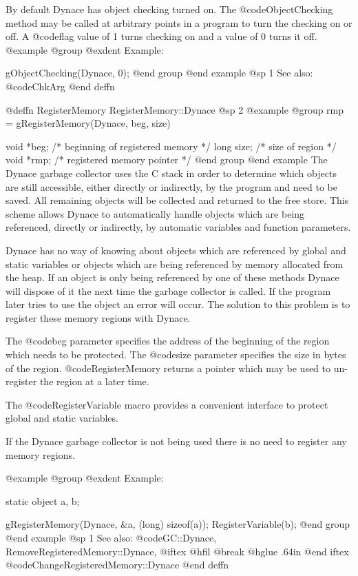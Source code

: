 By default Dynace has object checking turned on.  The @code{ObjectChecking}
method may be called at arbitrary points in a program to turn the checking
on or off.  A @code{flag} value of 1 turns checking on and a value of 0
turns it off.
@example
@group
@exdent Example:

gObjectChecking(Dynace, 0);
@end group
@end example
@sp 1
See also:  @code{ChkArg}
@end deffn





@deffn {RegisterMemory} RegisterMemory::Dynace
@sp 2
@example
@group
rmp = gRegisterMemory(Dynace, beg, size)

void    *beg;   /*  beginning of registered memory  */
long    size;   /*  size of region      */
void    *rmp;   /*  registered memory pointer  */
@end group
@end example
The Dynace garbage collector uses the C stack in order to determine which
objects are still accessible, either directly or indirectly, by the
program and need to be saved.  All remaining objects will be collected
and returned to the free store.  This scheme allows Dynace to automatically
handle objects which are being referenced, directly or indirectly, by
automatic variables and function parameters.

Dynace has no way of knowing about objects which are referenced by global
and static variables or objects which are being referenced by memory
allocated from the heap.  If an object is only being referenced by
one of these methods Dynace will dispose of it the next time the
garbage collector is called.  If the program later tries to use the
object an error will occur.  The solution to this problem is to
register these memory regions with Dynace.

The @code{beg} parameter specifies the address of the beginning of the
region which needs to be protected.  The @code{size} parameter specifies
the size in bytes of the region.  @code{RegisterMemory} returns a pointer
which may be used to un-register the region at a later time.

The @code{RegisterVariable} macro provides a convenient interface
to protect global and static variables.

If the Dynace garbage collector is not being used there is no need to
register any memory regions.

@example
@group
@exdent Example:

static  object  a, b;

gRegisterMemory(Dynace, &a, (long) sizeof(a));
RegisterVariable(b);
@end group
@end example
@sp 1
See also:  @code{GC::Dynace, RemoveRegisteredMemory::Dynace,}
@iftex
@hfil @break @hglue .64in   
@end iftex
@code{ChangeRegisteredMemory::Dynace}
@end deffn





